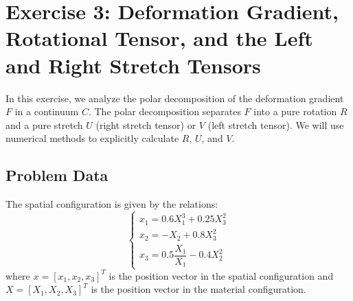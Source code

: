 \documentclass{article}
\begin{document}
\section{Exercise 3: Deformation Gradient, Rotational Tensor, and the Left and Right Stretch Tensors}


In this exercise, we analyze the polar decomposition of the deformation gradient $ F $ in a continuum $ C $. The polar decomposition separates $ F $ into a pure rotation $ R $ and a pure stretch $ U $ (right stretch tensor) or $ V $ (left stretch tensor). We will use numerical methods to explicitly calculate $ R $, $ U $, and $ V $.

\subsection{Problem Data}
The spatial configuration is given by the relations:
$$
\begin{cases}
x_1 = 0.6 X_1^3 + 0.25 X_3^2 \\
x_2 = -X_2 + 0.8 X_3^2 \\
x_3 = 0.5 \dfrac{X_1}{X_1} - 0.4 X_2^2
\end{cases}
$$
where $ x = [x_1, x_2, x_3]^T $ is the position vector in the spatial configuration and $ X = [X_1, X_2, X_3]^T $ is the position vector in the material configuration.
\end{document}
